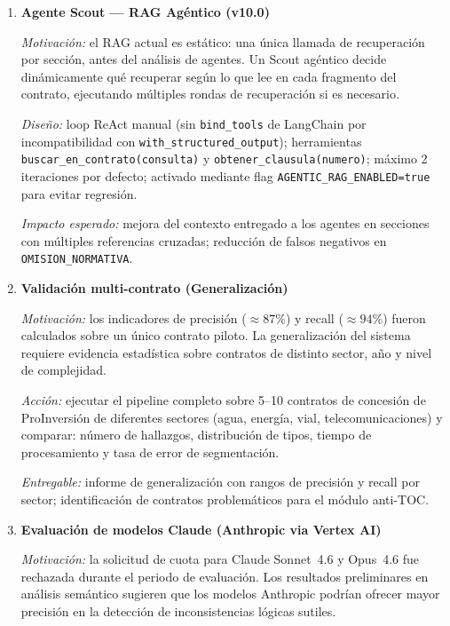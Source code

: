 \begin{enumerate}

    \item \textbf{Agente Scout — RAG Agéntico (v10.0)}

    \textit{Motivación:} el RAG actual es estático: una única llamada de
    recuperación por sección, antes del análisis de agentes. Un Scout
    agéntico decide dinámicamente qué recuperar según lo que lee en cada
    fragmento del contrato, ejecutando múltiples rondas de recuperación
    si es necesario.

    \textit{Diseño:} loop ReAct manual (sin \texttt{bind\_tools} de
    LangChain por incompatibilidad con \texttt{with\_structured\_output});
    herramientas \texttt{buscar\_en\_contrato(consulta)} y
    \texttt{obtener\_clausula(numero)}; máximo 2 iteraciones por defecto;
    activado mediante flag \texttt{AGENTIC\_RAG\_ENABLED=true} para evitar
    regresión.

    \textit{Impacto esperado:} mejora del contexto entregado a los agentes
    en secciones con múltiples referencias cruzadas; reducción de falsos
    negativos en \texttt{OMISION\_NORMATIVA}.

    \item \textbf{Validación multi-contrato (Generalización)}

    \textit{Motivación:} los indicadores de precisión ($\approx 87\%$) y
    recall ($\approx 94\%$) fueron calculados sobre un único contrato piloto.
    La generalización del sistema requiere evidencia estadística sobre
    contratos de distinto sector, año y nivel de complejidad.

    \textit{Acción:} ejecutar el pipeline completo sobre 5--10 contratos de
    concesión de ProInversión de diferentes sectores (agua, energía, vial,
    telecomunicaciones) y comparar: número de hallazgos, distribución de
    tipos, tiempo de procesamiento y tasa de error de segmentación.

    \textit{Entregable:} informe de generalización con rangos de precisión
    y recall por sector; identificación de contratos problemáticos para el
    módulo anti-TOC.

    \item \textbf{Evaluación de modelos Claude (Anthropic via Vertex AI)}

    \textit{Motivación:} la solicitud de cuota para Claude Sonnet~4.6 y
    Opus~4.6 fue rechazada durante el periodo de evaluación. Los resultados
    preliminares en análisis semántico sugieren que los modelos Anthropic
    podrían ofrecer mayor precisión en la detección de inconsistencias
    lógicas sutiles.


\end{enumerate}
